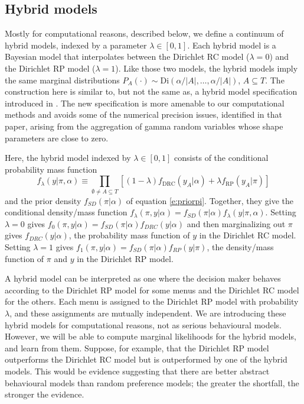 \documentclass[11pt,letter]{article}
\newcommand{\Dpi}{Dirichlet RP model}
\newcommand{\DP}{Dirichlet RC model}
\begin{document}
\subsection{Hybrid models}

Mostly for computational reasons, described below, we define a continuum of hybrid models, indexed by a parameter $\lambda \in [0,1]$.
Each hybrid model is a Bayesian model that interpolates between the \DP{} ($\lambda = 0$) and the \Dpi{} ($\lambda = 1$).
Like those two models, the hybrid models imply the same marginal distributions $P_A(\cdot) \sim \mathrm{Di}(\alpha/|A|,\ldots,\alpha/|A|)$, $A \subseteq T$.
The construction here is similar to, but not the same as, a hybrid model specification introduced in .
The new specification is more amenable to our computational methods and avoids some of the numerical precision issues, identified in that paper, arising from the aggregation of gamma random variables whose shape parameters are close to zero.

Here, the hybrid model indexed by $\lambda \in [0,1]$ consists of the conditional probability mass function
\[
  f_\lambda(y|\pi, \alpha) \equiv \prod_{\emptyset \neq A \subseteq T}
  \left[(1-\lambda) f_{\mathrm{DRC}}(y_A|\alpha) + \lambda f_{\mathrm{RP}}(y_A|\pi) \right]
\]
and the prior density $f_{SD}(\pi|\alpha)$ of equation \eqref{e:priorpi}.
Together, they give the conditional density/mass function $f_\lambda(\pi,y|\alpha) = f_{SD}(\pi|\alpha) f_\lambda(y|\pi, \alpha)$.
Setting $\lambda = 0$ gives $f_0(\pi,y|\alpha) = f_{SD}(\pi|\alpha) f_{DRC}(y|\alpha)$ and then marginalizing out $\pi$ gives $f_{DRC}(y|\alpha)$, the probability mass function of $y$ in the \DP{}.
Setting $\lambda = 1$ gives $f_1(\pi,y|\alpha) = f_{SD}(\pi|\alpha) f_{RP}(y|\pi)$, the density/mass function of $\pi$ and $y$ in the \Dpi{}.

A hybrid model can be interpreted as one where the decision maker behaves according to the \Dpi{} for some menus and the \DP{} for the others.
Each menu is assigned to the \Dpi{} with probability $\lambda$, and these assignments are mutually independent.
We are introducing these hybrid models for computational reasons, not as serious behavioural models.
However, we will be able to compute marginal likelihoods for the hybrid models, and learn from them.
Suppose, for example, that the \Dpi{} outperforms the \DP{} but is outperformed by one of the hybrid models.
This would be evidence suggesting that there are better abstract behavioural models than random preference models; the greater the shortfall, the stronger the evidence.
\end{document}
